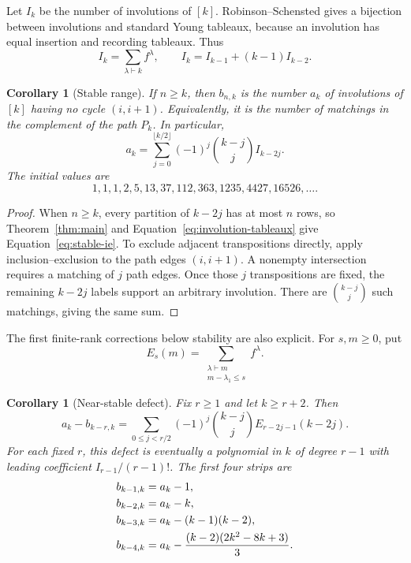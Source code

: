 \documentclass[11pt]{article}
\newtheorem{corollary}[theorem]{Corollary}
\theoremstyle{definition}
\begin{document}
Let $I_k$ be the number of involutions of $[k]$.  Robinson--Schensted gives a
bijection between involutions and standard Young tableaux, because an
involution has equal insertion and recording tableaux.  Thus
\begin{equation}\label{eq:involution-tableaux}
 I_k=\sum_{\lambda\vdash k}f^\lambda,
 \qquad I_k=I_{k-1}+(k-1)I_{k-2}.
\end{equation}

\begin{corollary}[Stable range]\label{cor:stable}
If $n\ge k$, then $b_{n,k}$ is the number $a_k$ of involutions of $[k]$
having no cycle $(i,i+1)$.  Equivalently, it is the number of matchings in
the complement of the path $P_k$.  In particular,
\begin{equation}\label{eq:stable-ie}
 a_k=\sum_{j=0}^{\lfloor k/2\rfloor}(-1)^j
 \binom{k-j}{j}I_{k-2j}.
\end{equation}
The initial values are
\[
1,1,1,2,5,13,37,112,363,1235,4427,16526,\ldots.
\]
\end{corollary}

\begin{proof}
When $n\ge k$, every partition of $k-2j$ has at most $n$ rows, so
Theorem~\ref{thm:main} and Equation~\eqref{eq:involution-tableaux} give
Equation~\eqref{eq:stable-ie}.  To exclude adjacent transpositions directly,
apply inclusion--exclusion to the path edges $(i,i+1)$.  A nonempty
intersection requires a matching of $j$ path edges.  Once those $j$
transpositions are fixed, the remaining $k-2j$ labels support an arbitrary
involution.  There are $\binom{k-j}{j}$ such matchings, giving the same sum.
\end{proof}

The first finite-rank corrections below stability are also explicit.  For
$s,m\ge0$, put
\begin{equation}\label{eq:tail-tableaux}
 E_s(m)=\sum_{\substack{\lambda\vdash m\\m-\lambda_1\le s}}f^\lambda.
\end{equation}

\begin{corollary}[Near-stable defect]\label{cor:near-stable}
Fix $r\ge1$ and let $k\ge r+2$.  Then
\begin{equation}\label{eq:near-stable-defect}
 a_k-b_{k-r,k}
 =\sum_{0\le j<r/2}(-1)^j\binom{k-j}{j}
 E_{r-2j-1}(k-2j).
\end{equation}
For each fixed $r$, this defect is eventually a polynomial in $k$ of degree
$r-1$ with leading coefficient $I_{r-1}/(r-1)!$.  The first four strips are
\begin{align}\label{eq:first-near-stable-strips}
 b_{k-1,k}&=a_k-1,\notag\\
 b_{k-2,k}&=a_k-k,\notag\\
 b_{k-3,k}&=a_k-(k-1)(k-2),\\
 b_{k-4,k}&=a_k-\frac{(k-2)(2k^2-8k+3)}3.\notag
\end{align}
\end{corollary}
\end{document}
